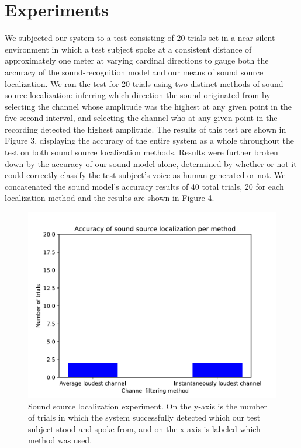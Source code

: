 \documentclass{article}
\begin{document}
\section{Experiments}
We subjected our system to a test consisting of 20 trials set in a near-silent environment in which a test subject spoke at a consistent distance of approximately one meter at varying cardinal directions to gauge both the accuracy of the sound-recognition model and our means of sound source localization. We ran the test for 20 trials using two distinct methods of sound source localization: inferring which direction the sound originated from by selecting the channel whose amplitude was the highest at any given point in the five-second interval, and selecting the channel who at any given point in the recording detected the highest amplitude. The results of this test are shown in Figure 3, displaying the accuracy of the entire system as a whole throughout the test on both sound source localization methods. Results were further broken down by the accuracy of our sound model alone, determined by whether or not it could correctly classify the test subject’s voice as human-generated or not. We concatenated the sound model's accuracy results of 40 total trials, 20 for each localization method and the results are shown in Figure 4.
\begin{figure}
\begin{center}
\centerline{\includegraphics[width=\columnwidth]{localization_test}}
\caption{Sound source localization experiment. On the y-axis is the number of trials in which the system successfully detected which our test subject stood and spoke from, and on the x-axis is labeled which method was used.}
\end{center}
\end{figure} 
\end{document}

